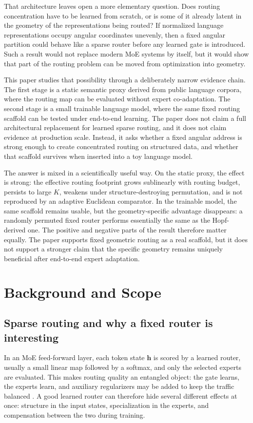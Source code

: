 \documentclass[10pt,letterpaper]{article}
\begin{document}
That architecture leaves open a more elementary question. Does routing concentration have to be learned from scratch, or is some of it already latent in the geometry of the representations being routed? If normalized language representations occupy angular coordinates unevenly, then a fixed angular partition could behave like a sparse router before any learned gate is introduced. Such a result would not replace modern MoE systems by itself, but it would show that part of the routing problem can be moved from optimization into geometry.

This paper studies that possibility through a deliberately narrow evidence chain. The first stage is a static semantic proxy derived from public language corpora, where the routing map can be evaluated without expert co-adaptation. The second stage is a small trainable language model, where the same fixed routing scaffold can be tested under end-to-end learning. The paper does not claim a full architectural replacement for learned sparse routing, and it does not claim evidence at production scale. Instead, it asks whether a fixed angular address is strong enough to create concentrated routing on structured data, and whether that scaffold survives when inserted into a toy language model.

The answer is mixed in a scientifically useful way. On the static proxy, the effect is strong: the effective routing footprint grows sublinearly with routing budget, persists to large $K$, weakens under structure-destroying permutation, and is not reproduced by an adaptive Euclidean comparator. In the trainable model, the same scaffold remains usable, but the geometry-specific advantage disappears: a randomly permuted fixed router performs essentially the same as the Hopf-derived one. The positive and negative parts of the result therefore matter equally. The paper supports fixed geometric routing as a real scaffold, but it does not support a stronger claim that the specific geometry remains uniquely beneficial after end-to-end expert adaptation.

\section{Background and Scope}
\subsection{Sparse routing and why a fixed router is interesting}
In an MoE feed-forward layer, each token state $\mathbf{h}$ is scored by a learned router, usually a small linear map followed by a softmax, and only the selected experts are evaluated. This makes routing quality an entangled object: the gate learns, the experts learn, and auxiliary regularizers may be added to keep the traffic balanced \citep{shazeer2017outrageously, fedus2022switch}. A good learned router can therefore hide several different effects at once: structure in the input states, specialization in the experts, and compensation between the two during training.
\end{document}
